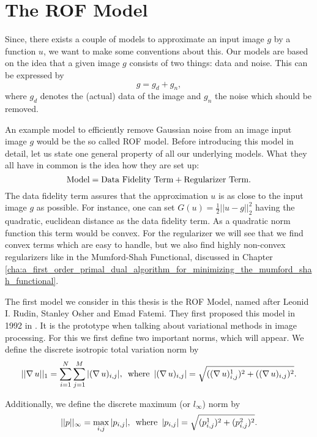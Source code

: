 \section{The ROF Model} %
\label{sec:the_rof_model}

    Since, there exists a couple of models to approximate an input image $g$ by a function $u$, we want to make some conventions about this. Our models are based on the idea that a given image $g$ consists of two things: data and noise. This can be expressed by
        $$
            g = g_{d} + g_{n},
        $$
    where $g_{d}$ denotes the (actual) data of the image and $g_{n}$ the noise which should be removed.

    An example model to efficiently remove Gaussian noise from an image input image $g$ would be the so called ROF model. Before introducing this model in detail, let us state one general property of all our underlying models. What they all have in common is the idea how they are set up:
        $$
            \textnormal{Model} = \textnormal{Data Fidelity Term} + \textnormal{Regularizer Term}.
        $$
    The data fidelity term assures that the approximation $u$ is as close to the input image $g$ as possible. For instance, one can set $G(u) = \frac{1}{2} ||u - g||_{2}^{2}$ having the quadratic, euclidean distance as the data fidelity term. As a quadratic norm function this term would be convex. For the regularizer we will see that we find convex terms which are easy to handle, but we also find highly non-convex regularizers like in the Mumford-Shah Functional, discussed in Chapter \ref{cha:a_first_order_primal_dual_algorithm_for_minimizing_the_mumford_shah_functional}.
    
    The first model we consider in this thesis is the ROF Model, named after Leonid I. Rudin, Stanley Osher and Emad Fatemi. They first proposed this model in 1992 in \cite{ROF}. It is the prototype when talking about variational methods in image processing. For this we first define two important norms, which will appear. We define the discrete isotropic total variation norm by
        \begin{equation}
            ||\nabla \, u||_{1} = \sum_{i = 1}^{N} \sum_{j = 1}^{M} |(\nabla \, u)_{i, j}|, \,\,\, \textnormal{where} \,\,\, |(\nabla \, u)_{i, j}| = \sqrt{((\nabla \, u)^{1}_{i, j})^{2} + ((\nabla \, u)_{i, j})^{2}}.
        \label{eq:isotropic_total_variation_norm}
        \end{equation}

    Additionally, we define the discrete maximum (or $l_{\infty}$) norm by
        \begin{equation}
            ||p||_{\infty} = \max_{i, j} |p_{i, j}|, \,\,\, \textnormal{where} \,\,\, |p_{i, j}| = \sqrt{(p^{1}_{i, j})^{2} + (p^{2}_{i, j})^{2}}.
        \end{equation}

